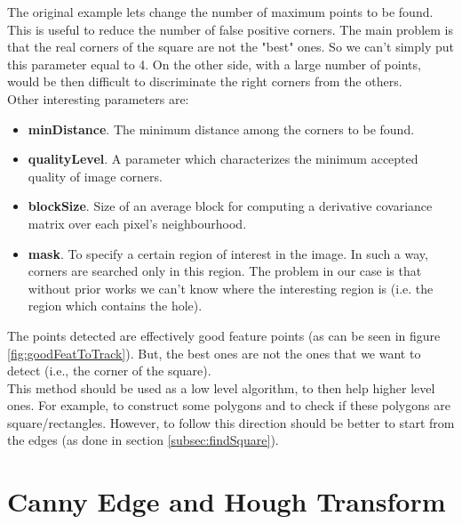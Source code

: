 The original example lets change the number of maximum points to be found. This is useful to reduce the number of false positive corners. The main problem is that the real corners of the square are not the "best" ones. So we can't simply put this parameter equal to 4. On the other side, with a large number of points, would be then difficult to discriminate the right corners from the others.\\
Other interesting parameters are:
\begin{itemize}
	\item \textbf{minDistance}. The minimum distance among the corners to be found.
	\item \textbf{qualityLevel}. A parameter which characterizes the minimum accepted quality of image corners.
	\item \textbf{blockSize}. Size of an average block for computing a derivative covariance matrix over each pixel's neighbourhood.
	\item \textbf{mask}. To specify a certain region of interest in the image. In such a way, corners are searched only in this region. The problem in our case is that without prior works we can't know where the interesting region is (i.e. the region which contains the hole).
\end{itemize}
The points detected are effectively good feature points (as can be seen in figure \ref{fig:goodFeatToTrack}). But, the best ones are not the ones that we want to detect (i.e., the corner of the square).\\
This method should be used as a low level algorithm, to then help higher level ones. For example, to construct some polygons and to check if these polygons are square/rectangles. However, to follow this direction should be better to start from the edges (as done in section \ref{subsec:findSquare}).\\
  
\section{Canny Edge and Hough Transform}
\label{sec:HoughTrasf}


